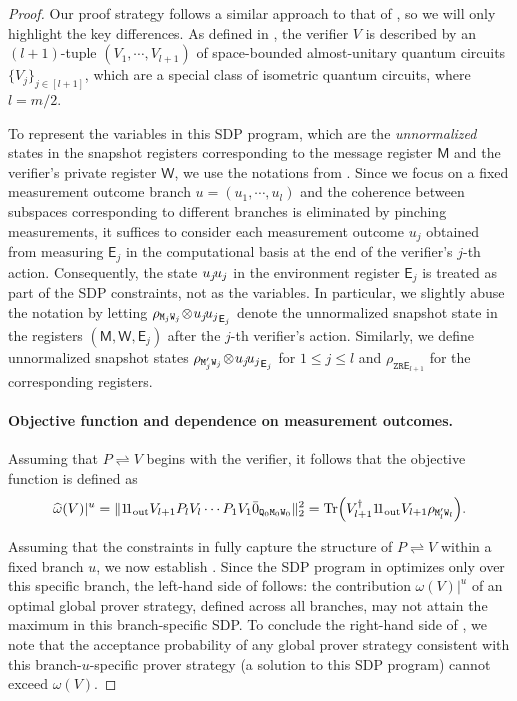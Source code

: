 \documentclass[10pt,a4paper]{article}
\numberwithin{equation}{section}
\numberwithin{figure}{section}
\newcommand{\protocol}[2]{{#1}\!\rightleftharpoons\!{#2}}
\DeclarePairedDelimiter\rbra{\lparen}{\rparen}
\let\ket\relax\DeclarePairedDelimiter\ket{\lvert}{\rangle}
\let\bra\relax\DeclarePairedDelimiter\bra{\langle}{\rvert}
\newcommand{\ketbra}[2]{\ensuremath{\ket{#1}\!\bra{#2}}}
\newcommand{\Tr}{\mathrm{Tr}}
\newcommand{\Out}{\mathrm{out}}
\newcommand{\sfE}{\mathsf{E}}
\newcommand{\sfM}{\mathsf{M}}
\newcommand{\sfW}{\mathsf{W}}
\newcommand{\ttM}{\mathtt{M}}
\newcommand{\ttQ}{\mathtt{Q}}
\newcommand{\ttR}{\mathtt{R}}
\newcommand{\ttW}{\mathtt{W}}
\newcommand{\ttZ}{\mathtt{Z}}
\begin{document}
\begin{proof}
    Our proof strategy follows a similar approach to that of , so we will only highlight the key differences. 
    As defined in , the verifier $V$ is described by an $(l+1)$-tuple $(V_1,\cdots,V_{l+1})$ of space-bounded almost-unitary quantum circuits $\{V_j\}_{j \in [l+1]}$, which are a special class of isometric quantum circuits, where $l = m/2$. 
    
    To represent the variables in this SDP program, which are the \textit{unnormalized} states in the snapshot registers corresponding to the message register $\sfM$ and the verifier's private register $\sfW$, we use the notations from . 
    Since we focus on a fixed measurement outcome branch $u=(u_1,\cdots,u_l)$ and the coherence between subspaces corresponding to different branches is eliminated by pinching measurements, it suffices to consider each measurement outcome $u_j$ obtained from measuring $\sfE_j$ in the computational basis at the end of the verifier's $j$-th action. Consequently, the state $\ketbra{u_j}{u_j}$ in the environment register $\sfE_j$ is treated as part of the SDP constraints, not as the variables. 
    In particular, we slightly abuse the notation by letting $\rho_{\ttM_j\ttW_j}\!\otimes\! \ketbra{u_j}{u_j}_{\sfE_j}$ denote the unnormalized snapshot state in the registers $(\sfM,\sfW,\sfE_j)$ after the $j$-th verifier's action. Similarly, we define unnormalized snapshot states $\rho_{\ttM'_j\ttW_j} \!\otimes\! \ketbra{u_j}{u_j}_{\sfE_j}$ for $1 \leq j \leq l$ and $\rho_{\ttZ\ttR\sfE_{l+1}}$ for the corresponding registers. 

    \paragraph{Objective function and dependence on measurement outcomes.}
    Assuming that $\protocol{P}{V}$ begins with the verifier, it follows that the objective function is defined as
    \begin{equation}
        \label{QIPL-objective-function}
        \widehat{\omega}(V)|^u = \| \ketbra{1}{1}_{\Out} V_{l+1} P_l V_l \cdots P_1 V_1 \ket{\bar{0}}_{\ttQ_0\ttM_0\ttW_0}\|_2^2
        = \Tr\rbra*{ V_{l+1}^{\dagger} \ketbra{1}{1}_{\Out} V_{l+1} \rho_{\ttM'_l\ttW_l} }. 
    \end{equation}

    Assuming that the constraints in  fully capture the structure of $\protocol{P}{V}$ within a fixed branch $u$, we now establish . 
    Since the SDP program in  optimizes only over this specific branch, the left-hand side of  follows: the contribution $\omega(V)|^u$ of an optimal global prover strategy, defined across all branches, may not attain the maximum in this branch-specific SDP. To conclude the right-hand side of , we note that the acceptance probability of any global prover strategy consistent with this branch-$u$-specific prover strategy (a solution to this SDP program) cannot exceed $\omega(V)$. 


\end{proof}
\end{document}
